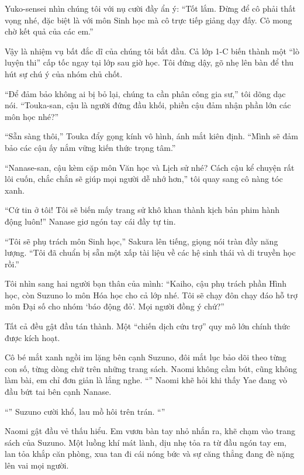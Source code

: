 \documentclass[../main.tex]{subfiles}
\begin{document}
Yuko-sensei nhìn chúng tôi với nụ cười đầy ẩn ý: ``Tốt lắm. Đừng để cô phải thất vọng nhé, đặc biệt là với môn Sinh học mà cô trực tiếp giảng dạy đấy. Cô mong chờ kết quả của các em.''

Vậy là nhiệm vụ bất đắc dĩ của chúng tôi bắt đầu. Cả lớp 1-C biến thành một ``lò luyện thi'' cấp tốc ngay tại lớp sau giờ học. Tôi đứng dậy, gõ nhẹ lên bàn để thu hút sự chú ý của nhóm chủ chốt.

``Để đảm bảo không ai bị bỏ lại, chúng ta cần phân công gia sư,'' tôi dõng dạc nói. ``Touka-san, cậu là người đứng đầu khối, phiền cậu đảm nhận phần lớn các môn học nhé?''

``Sẵn sàng thôi,'' Touka đẩy gọng kính vô hình, ánh mắt kiên định. ``Mình sẽ đảm bảo các cậu ấy nắm vững kiến thức trọng tâm.''

``Nanase-san, cậu kèm cặp môn Văn học và Lịch sử nhé? Cách cậu kể chuyện rất lôi cuốn, chắc chắn sẽ giúp mọi người dễ nhớ hơn,'' tôi quay sang cô nàng tóc xanh.

``Cứ tin ở tôi! Tôi sẽ biến mấy trang sử khô khan thành kịch bản phim hành động luôn!'' Nanase giơ ngón tay cái đầy tự tin.

``Tôi sẽ phụ trách môn Sinh học,'' Sakura lên tiếng, giọng nói tràn đầy năng lượng. ``Tôi đã chuẩn bị sẵn một xấp tài liệu về các hệ sinh thái và di truyền học rồi.''

Tôi nhìn sang hai người bạn thân của mình: ``Kaiho, cậu phụ trách phần Hình học, còn Suzuno lo môn Hóa học cho cả lớp nhé. Tôi sẽ chạy đôn chạy đáo hỗ trợ môn Đại số cho nhóm `báo động đỏ'. Mọi người đồng ý chứ?''

Tất cả đều gật đầu tán thành. Một ``chiến dịch cứu trợ'' quy mô lớn chính thức được kích hoạt.

Cô bé mắt xanh ngồi im lặng bên cạnh Suzuno, đôi mắt lục bảo dõi theo từng con số, từng dòng chữ trên những trang sách. Naomi không cầm bút, cũng không làm bài, em chỉ đơn giản là lắng nghe. ``'' Naomi khẽ hỏi khi thấy Yae đang vò đầu bứt tai bên cạnh Nanase.

``'' Suzuno cười khổ, lau mồ hôi trên trán. ``''

Naomi gật đầu vẻ thấu hiểu. Em vươn bàn tay nhỏ nhắn ra, khẽ chạm vào trang sách của Suzuno. Một luồng khí mát lành, dịu nhẹ tỏa ra từ đầu ngón tay em, lan tỏa khắp căn phòng, xua tan đi cái nóng bức và sự căng thẳng đang đè nặng lên vai mọi người.
\end{document}

